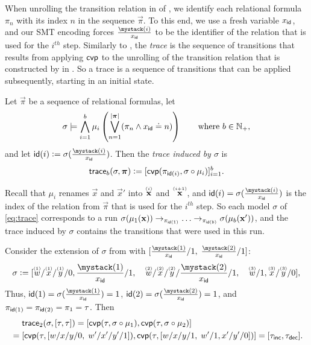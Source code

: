 When unrolling the transition relation in  of , we identify
each relational formula $\pi_n$ with its index $n$ in the sequence $\vec{\pi}$.
%
To this end, we use a fresh variable $x_{\mathsf{id}}$, and our SMT encoding forces
$\ind[\id]{x}{i}$ to be the identifier of the relation that is used for the $i^{th}$ step.
%
Similarly to \cite{abmc}, the \emph{trace} is the sequence of transitions that results from applying $\mathsf{cvp}$ to the unrolling
of the transition relation that is constructed by  in .
%
So a trace is a sequence of transitions that can be applied subsequently, starting in an initial state.
%
\begin{definition}[Trace]
  \label{def:trace}
  Let $\vec{\pi}$ be a sequence of relational formulas, let
  \begin{align}
    \label{eq:trace}
    \paper{\textstyle}
    \sigma \models \bigwedge_{i=1}^{b} \mu_{i}\left(\bigvee_{n=1}^{|\vec{\pi}|} (\pi_n \land x_\id \doteq n)\right) \qquad \text{where $b \in \NN_+$},
  \end{align}
  and let $\id(i) \Def \sigma(\ind[\id]{x}{i})$.
  Then the \emph{trace induced by $\sigma$} is
  \[
    \mathsf{trace}_b(\sigma,\bm{\mathrm{\pi}}) \mathrel{\mathop:}= [\mathsf{cvp}(\pi_{\mathsf{id}(i)}, \sigma \circ \mu_{i})]_{i=1}^{b}.
  \]
\end{definition}

Recall that $\mu_i$ renames $\vec{x}$ and $\vec{x}'$ into $\ind{\vec{x}}{i}$ and
$\ind{\vec{x}}{i+1}$, and $\id(i) = \sigma(\ind[\id]{x}{i})$ is the index of the
relation from $\vec{\pi}$ that is used for the $i^{th}$ step.
%
So each model $\sigma$ of \eqref{eq:trace} corresponds to a run $\sigma(\mu_1(\bm{\mathrm{x}}))
\to_{\pi_{\mathsf{id}(1)}} \ldots \to_{\pi_{\mathsf{id}(b)}} \sigma(\mu_{b}(\bm{\mathrm{x}}'))$,\paper{ \pagebreak[3]} and the trace
induced by $\sigma$ contains the transitions that were used in this run.

%
\begin{example}[Trace]
  \label{ex:trace}
  Consider the extension of $\sigma$ from  with $[\ind[\id]{x}{1}/1,\;
    \ind[\id]{x}{2}/1]$:
  \[
  \sigma \Def [\ind{w}{1}/\ind{x}{1}/\ind{y}{1}/0,\ind[\id]{x}{1}/1, \quad
    \ind{w}{2}/\ind{x}{2}/\ind{y}{2}/\ind[\id]{x}{2}/1, \quad \ind{w}{3}/1,\ind{x}{3}/\ind{y}{3}/0],
  \]
  Thus, $\id(1) = \sigma(\ind[\id]{x}{1}) = 1$, $\id(2) =  \sigma(\ind[\id]{x}{2}) = 1$, and
  $\pi_{\mathsf{id}(1)} = \pi_{\mathsf{id}(2)} =
  \pi_1 = \tau$.
  Then
  \begin{align*}
    & \mathsf{trace}_2(\sigma, [\tau,\tau]) = [\mathsf{cvp}(\tau,\sigma \circ \mu_{1}), \mathsf{cvp}(\tau,\sigma \circ \mu_{2})]           \\
    {} = {} & [\mathsf{cvp}(\tau,[w/x/y/0, \; w'/x'/y'/1]), \mathsf{cvp}(\tau,[w/x/y/1, \; w'/1,x'/y'/0])] = [\tau_{\mathsf{inc}}, \tau_{\mathsf{dec}}].
  \end{align*}
\end{example}

